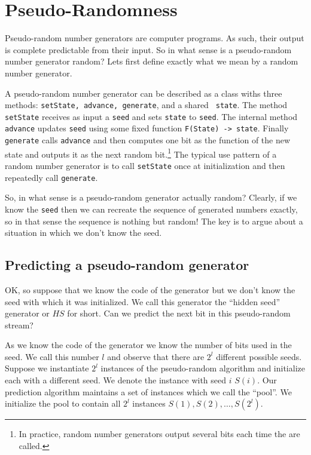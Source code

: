 \section{Pseudo-Randomness}

Pseudo-random number generators are computer programs. As such, their
output is complete predictable from their input. So in what sense is a
pseudo-random number generator random? Lets first define exactly what
we mean by a random number generator.

A pseudo-random number generator can be described as a class withs
three methods: {\tt setState, advance, generate}, and a shared {\tt
  state}. The method {\tt setState} receives as input a {\tt seed} and
sets {\tt state} to {\tt seed}. The internal method {\tt advance}
updates {\tt seed} using some fixed function {\tt F(State) ->
  state}. Finally {\tt generate} calls {\tt advance} and then computes
one bit as the function of the new state and outputs it as the next
random bit.\footnote{In practice, random number generators output
  several bits each time the are called.} The typical use pattern of a
random number generator is to call {\tt setState} once at
initialization and then repeatedly call {\tt generate}.

So, in what sense is a pseudo-random generator actually random?
Clearly, if we know the {\tt seed} then we can recreate the sequence
of generated numbers exactly, so in that sense the sequence is nothing
but random! The key is to argue about a situation in which we don't
know the seed.

\subsection{Predicting a pseudo-random generator}
OK, so suppose that we know the code of the generator but we don't
know the seed with which it was initialized. We call this generator
the ``hidden seed'' generator or $HS$ for short. Can we predict
the next bit in this pseudo-random stream?

As we know the code of the generator we know the number of bits used
in the seed. We call this number $l$ and observe that there are $2^l$
different possible seeds. Suppose we instantiate $2^l$ instances of
the pseudo-random algorithm and initialize each with a different
seed. We denote the instance with seed $i$ $S(i)$. Our prediction
algorithm maintains a set of instances which we call the ``pool''.  We
initialize the pool to contain all $2^l$ instances
$S(1),S(2),\ldots,S(2^l)$.

